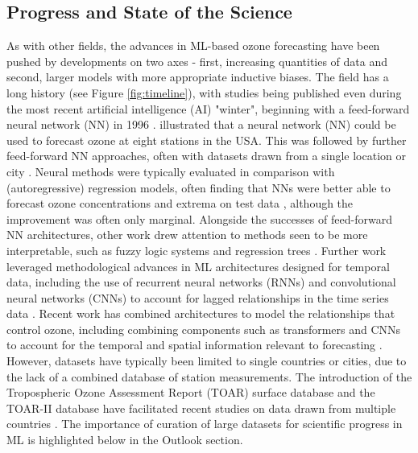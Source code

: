 \documentclass[gmd, manuscript]{copernicus}
\begin{document}
\subsection{Progress and State of the Science}

As with other fields, the advances in ML-based ozone forecasting have been pushed by developments on two axes - first, increasing quantities of data and second, larger models with more appropriate inductive biases. The field has a long history (see Figure \ref{fig:timeline}), with studies being published even during the most recent artificial intelligence (AI) "winter", beginning with a feed-forward neural network (NN) in 1996 \citep{Yi1996}. \citet{Comrie1997} illustrated that a neural network (NN) could be used to forecast ozone at eight stations in the USA. This was followed by further feed-forward NN approaches, often with datasets drawn from a single location or city \citep{cobourn_comparison_2000, Kolehmainen2001}. Neural methods were typically evaluated in comparison with (autoregressive) regression models, often finding that NNs were better able to forecast ozone concentrations and extrema on test data \citep{Nunnari1998, Schlink2003, Chaloulakou2003}, although the improvement was often only marginal. Alongside the successes of feed-forward NN architectures, other work drew attention to methods seen to be more interpretable, such as fuzzy logic systems and regression trees \citep{Gardner2000, heo_new_2004}. Further work leveraged methodological advances in ML architectures designed for temporal data, including the use of recurrent neural networks (RNNs) and convolutional neural networks (CNNs) to account for lagged relationships in the time series data \citep{Eslami2020, sayeed_novel_2021, Kleinert2021}. Recent work has combined architectures to model the relationships that control ozone, including combining components such as transformers and CNNs to account for the temporal and spatial information relevant to forecasting \citep{Chen2022, cheng_spatio-temporal_2022, han_capability_2023}. However, datasets have typically been limited to single countries or cities, due to the lack of a combined database of station measurements. The introduction of the Tropospheric Ozone Assessment Report (TOAR) surface database \citep{Schultz2017} and the TOAR-II database have facilitated recent studies on data drawn from multiple countries \citep{leufen_o3resnet_2023, Hickman2023}. The importance of curation of large datasets for scientific progress in ML is highlighted below in the Outlook section. 
\end{document}
